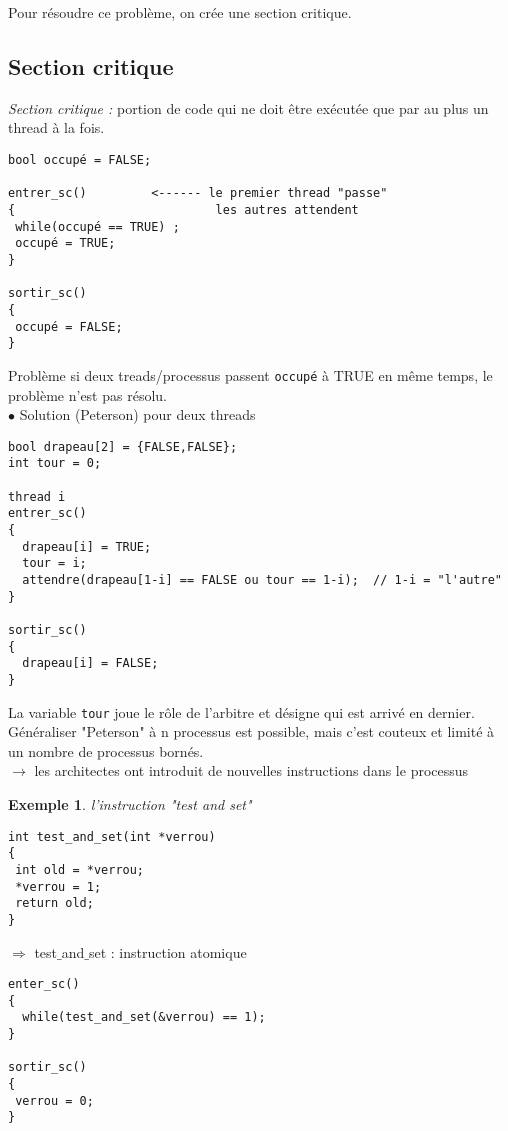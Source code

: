 \documentclass[12pt,a4paper]{report}
\newtheorem*{ex}{Exemple}
\begin{document}
Pour résoudre ce problème, on crée une section critique. \\

\subsection{Section critique}
\textit{Section critique :} portion de code qui ne doit être exécutée que par au plus un thread à la fois.

 \medskip
\begin{verbatim}
bool occupé = FALSE;

entrer_sc()         <------ le premier thread "passe"
{                            les autres attendent
 while(occupé == TRUE) ;
 occupé = TRUE;
}

sortir_sc()
{
 occupé = FALSE;
}
\end{verbatim}
\medskip
Problème si deux treads/processus passent \verb?occupé? à TRUE en même temps, le problème n'est pas résolu.\\


$\bullet$ Solution (Peterson) pour deux threads
\medskip
\begin{verbatim}
bool drapeau[2] = {FALSE,FALSE};
int tour = 0;

thread i
entrer_sc()
{
  drapeau[i] = TRUE;
  tour = i;
  attendre(drapeau[1-i] == FALSE ou tour == 1-i);  // 1-i = "l'autre"
}

sortir_sc()
{
  drapeau[i] = FALSE;
}
\end{verbatim}
\medskip
La variable \verb?tour? joue le rôle de l'arbitre et désigne qui est arrivé en dernier.\\

Généraliser "Peterson" à n processus est possible, mais c'est couteux et limité à un nombre de processus bornés.\\
$\rightarrow$ les architectes ont introduit de nouvelles instructions dans le processus\\

\begin{ex} l'instruction "test and set"\end{ex}
\begin{verbatim}
int test_and_set(int *verrou)
{
 int old = *verrou;
 *verrou = 1;
 return old;
}
\end{verbatim}
\medskip

$\Longrightarrow$ test$\_$and$\_$set : instruction atomique

\medskip
\begin{verbatim}
enter_sc()
{
  while(test_and_set(&verrou) == 1);
}

sortir_sc()
{
 verrou = 0;
}
\end{verbatim}
\medskip
\end{document}
